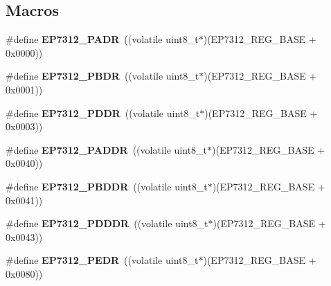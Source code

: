 \subsection*{Macros}
\begin{DoxyCompactItemize}
\item 
\mbox{\label{group__edb7312__registers_ga015f2dd84bd1335a1ffcff21ff42e2ca}} 
\#define {\bfseries E\+P7312\+\_\+\+P\+A\+DR}~((volatile uint8\+\_\+t$\ast$)(E\+P7312\+\_\+\+R\+E\+G\+\_\+\+B\+A\+SE + 0x0000))
\item 
\mbox{\label{group__edb7312__registers_ga84bdb31c9f3cae47912c1d8767cb4296}} 
\#define {\bfseries E\+P7312\+\_\+\+P\+B\+DR}~((volatile uint8\+\_\+t$\ast$)(E\+P7312\+\_\+\+R\+E\+G\+\_\+\+B\+A\+SE + 0x0001))
\item 
\mbox{\label{group__edb7312__registers_gab42682e723a09efff47d1c11ec26e622}} 
\#define {\bfseries E\+P7312\+\_\+\+P\+D\+DR}~((volatile uint8\+\_\+t$\ast$)(E\+P7312\+\_\+\+R\+E\+G\+\_\+\+B\+A\+SE + 0x0003))
\item 
\mbox{\label{group__edb7312__registers_ga75811a8a201b9621a530d9351c0c2556}} 
\#define {\bfseries E\+P7312\+\_\+\+P\+A\+D\+DR}~((volatile uint8\+\_\+t$\ast$)(E\+P7312\+\_\+\+R\+E\+G\+\_\+\+B\+A\+SE + 0x0040))
\item 
\mbox{\label{group__edb7312__registers_gad0a4ea015ee603f5a36f23a7cdac0254}} 
\#define {\bfseries E\+P7312\+\_\+\+P\+B\+D\+DR}~((volatile uint8\+\_\+t$\ast$)(E\+P7312\+\_\+\+R\+E\+G\+\_\+\+B\+A\+SE + 0x0041))
\item 
\mbox{\label{group__edb7312__registers_ga98ab4a5859048b148b1178e357989ab1}} 
\#define {\bfseries E\+P7312\+\_\+\+P\+D\+D\+DR}~((volatile uint8\+\_\+t$\ast$)(E\+P7312\+\_\+\+R\+E\+G\+\_\+\+B\+A\+SE + 0x0043))
\item 
\mbox{\label{group__edb7312__registers_ga1ef1b77742e310aa1bd4bff940f10259}} 
\#define {\bfseries E\+P7312\+\_\+\+P\+E\+DR}~((volatile uint8\+\_\+t$\ast$)(E\+P7312\+\_\+\+R\+E\+G\+\_\+\+B\+A\+SE + 0x0080))
\item 
\mbox{\label{group__edb7312__registers_ga43a764438cc28bf622416bf3ed32f5dc}} 

\end{DoxyCompactItemize}
